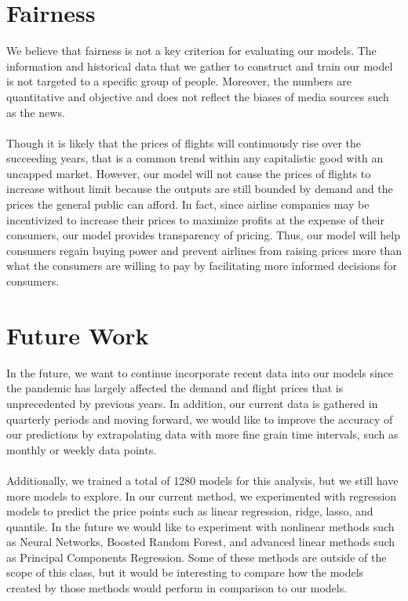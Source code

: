 \documentclass{article}
\begin{document}
\section{Fairness}
We believe that fairness is not a key criterion for evaluating our models. The information and historical data that we gather to construct and train our model is not targeted to a specific group of people. Moreover, the numbers are quantitative and objective and does not reflect the biases of media sources such as the news.\\\\
Though it is likely that the prices of flights will continuously rise over the succeeding years, that is a common trend within any capitalistic good with an uncapped market. However, our model will not cause the prices of flights to increase without limit because the outputs are still bounded by demand and the prices the general public can afford. In fact, since airline companies may be incentivized to increase their prices to maximize profits at the expense of their consumers, our model provides transparency of pricing. Thus, our model will help consumers regain buying power and prevent airlines from raising prices more than what the consumers are willing to pay by facilitating more informed decisions for consumers. 

\section{Future Work}
In the future, we want to continue incorporate recent data into our models since the pandemic has largely affected the demand and flight prices that is unprecedented by previous years. In addition, our current data is gathered in quarterly periods and moving forward, we would like to improve the accuracy of our predictions by extrapolating data with more fine grain time intervals, such as monthly or weekly data points.\\\\
Additionally, we trained a total of 1280 models for this analysis, but we still have more models to explore. In our current method, we experimented with regression models to predict the price points such as linear regression, ridge, lasso, and quantile. In the future we would like to experiment with nonlinear methods such as Neural Networks, Boosted Random Forest, and advanced linear methods such as Principal Components Regression. Some of these methods are outside of the scope of this class, but it would be interesting to compare how the models created by those methods would perform in comparison to our models.
\newpage
\end{document}
